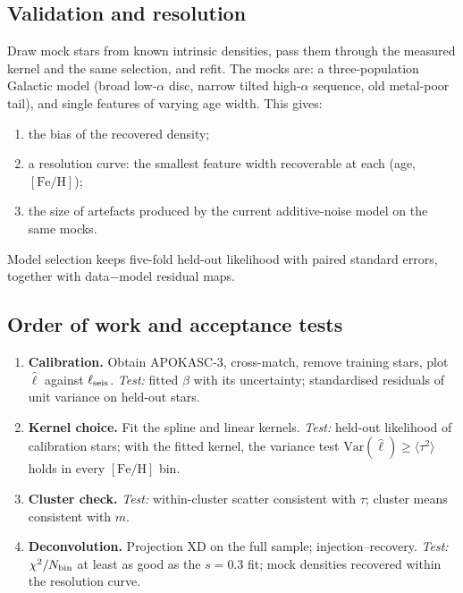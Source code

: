 \documentclass[11pt,a4paper]{article}
\newcommand{\feh}{\ensuremath{[\mathrm{Fe/H}]}}
\begin{document}
\subsection{Validation and resolution}
Draw mock stars from known intrinsic densities, pass them through the measured kernel and the same selection, and refit. The mocks are: a three-population Galactic model (broad low-$\alpha$ disc, narrow tilted high-$\alpha$ sequence, old metal-poor tail), and single features of varying age width. This gives:
\begin{enumerate}
  \item the bias of the recovered density;
  \item a resolution curve: the smallest feature width recoverable at each (age, \feh);
  \item the size of artefacts produced by the current additive-noise model on the same mocks.
\end{enumerate}
Model selection keeps five-fold held-out likelihood with paired standard errors, together with data$-$model residual maps.

\subsection{Order of work and acceptance tests}
\begin{enumerate}
  \item \textbf{Calibration.} Obtain APOKASC-3, cross-match, remove training stars, plot $\hat\ell$ against $\ell_{\rm seis}$.
    \emph{Test:} fitted $\beta$ with its uncertainty; standardised residuals of unit variance on held-out stars.
  \item \textbf{Kernel choice.} Fit the spline and linear kernels.
    \emph{Test:} held-out likelihood of calibration stars; with the fitted kernel, the variance test $\mathrm{Var}(\hat\ell)\ge\langle\tau^2\rangle$ holds in every \feh{} bin.
  \item \textbf{Cluster check.} \emph{Test:} within-cluster scatter consistent with $\tau$; cluster means consistent with $m$.
  \item \textbf{Deconvolution.} Projection XD on the full sample; injection--recovery.
    \emph{Test:} $\chi^2/N_{\rm bin}$ at least as good as the $s=0.3$ fit; mock densities recovered within the resolution curve.
\end{enumerate}
\end{document}
